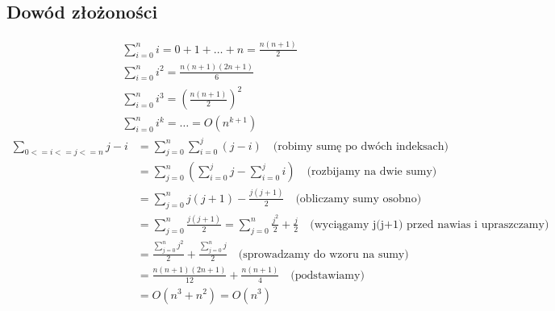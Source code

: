 \documentclass{article}
\begin{document}
\subsection{Dowód złożoności}
\begin{gather}
	\sum_{i = 0}^n i = 0 + 1 + \dots + n = \frac{n(n+1)}{2} \\
	\sum_{i = 0}^n i^2 = \frac{n(n+1)(2n+1)}{6} \\
	\sum_{i = 0}^n i^3 = (\frac{n(n+1)}{2})^2 \\
	\sum_{i = 0}^n i^k = \dots =  O(n^{k+1})
\end{gather}
\begin{equation}
\begin{split}
\sum_{0 <= i <= j <=n} j - i & = \sum_{j = 0}^{n} \sum_{i=0}^{j} (j - i) \quad\text{(robimy sumę po dwóch indeksach)}  \\
&= \sum_{j = 0}^{n}(\sum_{i=0}^j j - \sum_{i = 0}^j i) \quad\text{(rozbijamy na dwie sumy)}\\
&= \sum_{j = 0}^n j(j+1) - \frac{j(j+1)}{2} \quad\text{(obliczamy sumy osobno)} \\
&= \sum_{j = 0}^n \frac{j(j+1)}{2} = \sum_{j = 0}^n \frac{j^2}{2} + \frac{j}{2} \quad\text{(wyciągamy j(j+1) przed nawias i upraszczamy)}\\
&= \frac{\sum_{j = 0}^n j^2}{2} + \frac{\sum_{j = 0}^n j}{2} \quad\text{(sprowadzamy do wzoru na sumy)} \\
&= \frac{n(n+1)(2n+1)}{12} + \frac{n(n+1)}{4} \quad\text{(podstawiamy)} \\
&= O(n^3 + n^2) = O(n^3)
\end{split}
\end{equation}
\end{document}
